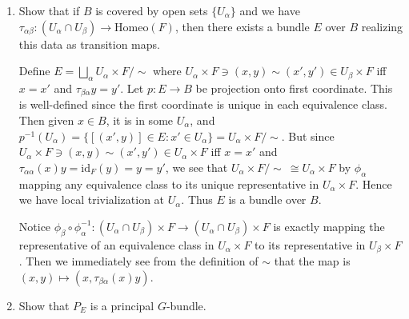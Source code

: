 \documentclass[12pt]{article}
\begin{document}
\begin{problem}[7]
\begin{enumerate}[label=(\arabic*)]
	\item Show that if $ B$ is covered by open sets  $ \{U_{ \alpha}\} $ and we have $ \tau_{ \alpha \beta}: (U_{ \alpha} \cap U_{ \beta}) \to \text{Homeo}(F)$, then there exists a bundle $ E$ over  $ B$ realizing this data as transition maps.

		Define  $ E = \bigsqcup_{ \alpha}U_{ \alpha} \times F / \sim$ where $ U_{ \alpha} \times F \ni (x,y) \sim (x',y') \in U_{ \beta} \times F$ iff $ x=x'$ and  $ \tau_{ \beta \alpha}y=y'$. Let $ p: E \to B$ be projection onto first coordinate. This is well-defined since the first coordinate is unique in each equivalence class. Then given $ x \in B$, it is in some $ U_{ \alpha}$, and $ p^{-1}(U_{ \alpha}) = \{[(x',y)] \in E: x' \in U_{ \alpha}\} = U_{ \alpha} \times F / \sim $. But since $ U_{ \alpha} \times F \ni (x,y) \sim (x',y') \in U_{ \alpha} \times F$ iff $ x=x'$ and  $ \tau_{ \alpha \alpha}(x) y = \text{id}_{ F}(y) = y = y'$, we see that $ U_{ \alpha} \times F /\sim \ \cong U_{ \alpha} \times F$ by $ \phi_{ \alpha}$ mapping any equivalence class to its unique representative in $ U_{ \alpha} \times F$. Hence we have local trivialization at $ U_{ \alpha}$. Thus $ E$ is a bundle over  $ B$.

		Notice $ \phi_{ \beta} \circ \phi_{ \alpha}^{-1}: (U_{ \alpha} \cap U_{ \beta}) \times F \to (U_{ \alpha} \cap U_{ \beta}) \times F$ is exactly mapping the representative of an equivalence class in $ U_{ \alpha} \times F $ to its representative in $ U_{ \beta} \times F$. Then we immediately see from the definition of $ \sim$ that the map is $ (x,y) \mapsto (x, \tau_{ \beta \alpha}(x)y)$.
	\item Show that $ P_E$ is a principal  $ G$-bundle.


\end{enumerate}
\end{problem}
\end{document}
